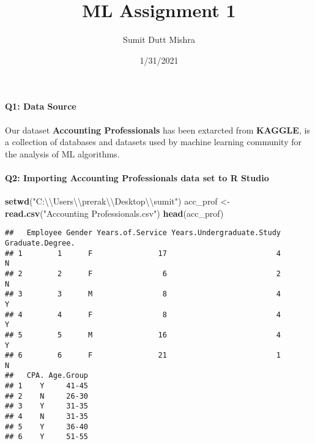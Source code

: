 \documentclass[
]{article}
\title{ML Assignment 1}
\author{Sumit Dutt Mishra}
\date{1/31/2021}
\newenvironment{Shaded}{\begin{snugshade}}{\end{snugshade}}
\newcommand{\CharTok}[1]{\textcolor[rgb]{0.31,0.60,0.02}{#1}}
\newcommand{\KeywordTok}[1]{\textcolor[rgb]{0.13,0.29,0.53}{\textbf{#1}}}
\newcommand{\NormalTok}[1]{#1}
\newcommand{\StringTok}[1]{\textcolor[rgb]{0.31,0.60,0.02}{#1}}
\begin{document}
\maketitle

\hypertarget{q1-data-source}{%
\paragraph{Q1: Data Source}\label{q1-data-source}}

Our dataset \textbf{Accounting Professionals} has been extarcted from
\textbf{KAGGLE}, is a collection of databases and datasets used by
machine learning community for the analysis of ML algorithms.

\hypertarget{q2-importing-accounting-professionals-data-set-to-r-studio}{%
\paragraph{Q2: Importing Accounting Professionals data set to R
Studio}\label{q2-importing-accounting-professionals-data-set-to-r-studio}}

\begin{Shaded}
\begin{Highlighting}[]
\KeywordTok{setwd}\NormalTok{(}\StringTok{"C:}\CharTok{\textbackslash{}\textbackslash{}}\StringTok{Users}\CharTok{\textbackslash{}\textbackslash{}}\StringTok{prerak}\CharTok{\textbackslash{}\textbackslash{}}\StringTok{Desktop}\CharTok{\textbackslash{}\textbackslash{}}\StringTok{sumit"}\NormalTok{)}
\NormalTok{acc\_prof \textless{}{-}}\StringTok{ }\KeywordTok{read.csv}\NormalTok{(}\StringTok{"Accounting Professionals.csv"}\NormalTok{)}
\KeywordTok{head}\NormalTok{(acc\_prof)}
\end{Highlighting}
\end{Shaded}

\begin{verbatim}
##   Employee Gender Years.of.Service Years.Undergraduate.Study Graduate.Degree.
## 1        1      F               17                         4                N
## 2        2      F                6                         2                N
## 3        3      M                8                         4                Y
## 4        4      F                8                         4                Y
## 5        5      M               16                         4                Y
## 6        6      F               21                         1                N
##   CPA. Age.Group
## 1    Y     41-45
## 2    N     26-30
## 3    Y     31-35
## 4    N     31-35
## 5    Y     36-40
## 6    Y     51-55
\end{verbatim}
\end{document}
